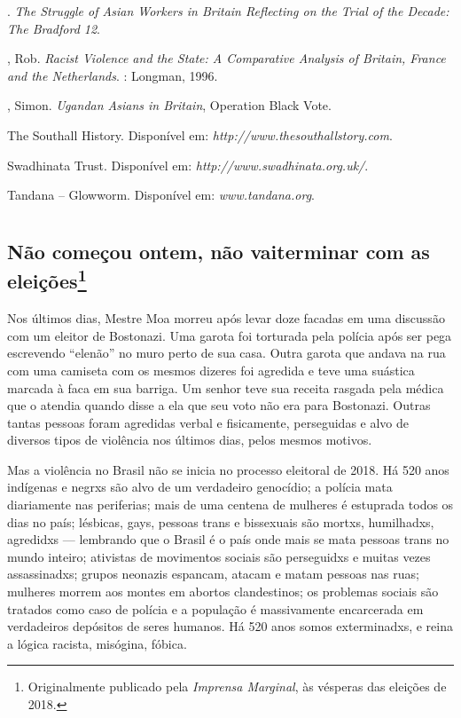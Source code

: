 \begin{Parskip}
. \emph{The Struggle of Asian Workers in Britain Reflecting on the Trial of the Decade: The Bradford 12}.

, Rob. \emph{Racist Violence and the State: A Comparative Analysis of Britain, France and the Netherlands}. : Longman, 1996.

, Simon. \emph{Ugandan Asians in Britain}, Operation Black Vote.

The Southall History. Disponível em: \emph{http://www.thesouthallstory.com}.

Swadhinata Trust. Disponível em: \emph{http://www.swadhinata.org.uk/}.

Tandana -- Glowworm. Disponível em:  \emph{www.tandana.org}.
\end{Parskip}


\part{}

\chapter[Não começou ontem, não vai terminar com as eleições]{Não começou ontem, não vai\break terminar com as eleições\footnote[*]{Originalmente publicado pela \emph{Imprensa Marginal}, às vésperas das eleições de 2018.}}



Nos últimos dias, Mestre Moa morreu após levar doze facadas em uma discussão com um eleitor de Bostonazi. Uma garota foi torturada pela polícia após ser pega escrevendo ``elenão'' no muro perto de sua casa. Outra garota que andava na rua com uma camiseta com os mesmos dizeres foi agredida e teve uma suástica marcada à faca em sua barriga. Um senhor teve sua receita rasgada pela médica que o atendia quando disse a ela que seu voto não era para Bostonazi. Outras tantas pessoas foram agredidas verbal e fisicamente, perseguidas e alvo de diversos tipos de violência nos últimos dias, pelos mesmos motivos.

Mas a violência no Brasil não se inicia no processo eleitoral de 2018. Há 520 anos indígenas e negrxs são alvo de um verdadeiro genocídio; a polícia mata diariamente nas periferias; mais de uma centena de mulheres é estuprada todos os dias no país; lésbicas, gays, pessoas trans e bissexuais são mortxs, humilhadxs, agredidxs --- lembrando que o Brasil é o país onde mais se mata pessoas trans no mundo inteiro; ativistas de movimentos sociais são perseguidxs e muitas vezes assassinadxs; grupos neonazis espancam, atacam e matam pessoas nas ruas; mulheres morrem aos montes em abortos clandestinos; os problemas sociais são tratados como caso de polícia e a população é massivamente encarcerada em verdadeiros depósitos de seres humanos. Há 520 anos somos exterminadxs, e reina a lógica racista, misógina, fóbica.

